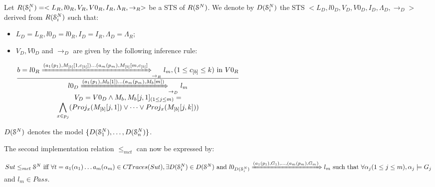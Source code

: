 
\begin{definition}
    Let
    $R(\EuScript{S}_i^{N})=<L_R,l0_R,V_R,V0_R,I_R,\Lambda_R,\rightarrow_R>$
    be a STS of $R(\EuScript{S}^{N})$. We denote by $D(\EuScript{S}_i^{N})$ the STS $ <L_D,l0_D,V_D,V0_D,I_D,\Lambda_D,\rightarrow_D>$ derived from $R(\EuScript{S}_i^{N})$ such that:
\begin{itemize}
    \item $L_D=L_{R}, l0_D=l0_{R}, I_D=I_{R},
        \Lambda_D=\Lambda_{R}$;
    \item $V_D, V0_D$ and $\rightarrow_D$ are given by the following inference rule:

				$\frac{
					\begin{matrix}
					b=l0_{R}
					\xRightarrow{(a_1(p_1),M_{[b]}[1,c_{[b]}])\dots (a_m(p_m),M_{[b]}[m,c_{[b]}]}_{\rightarrow_{R}}
					l_{m},
					(1 \leq c_{[b]} \leq k) \text{ in } V0_{R}
					\end{matrix}
				}
				{
					\begin{matrix}
					l0_D
					\xRightarrow{(a_1(p_1),M_b[1])\dots (a_m(p_m),M_b[m])}_{\rightarrow_D}
					l_m\\
					V_D=V0_D \wedge M_b, M_b[j, 1]_{(1\leq j \leq m)} =\\
					 \displaystyle \bigwedge_{x \in p_j} ( Proj_x(M_{[b]}[j, 1]) \vee \dots \vee Proj_x(M_{[b]}[j, k]))



					\end{matrix}
				}$
  \end{itemize}

    $D(\EuScript{S}^{N})$ denotes the model $\{D(\EuScript{S}_1^{N}),\dots,D(\EuScript{S}_n^{N}) \}$.
\end{definition}


The second implementation relation $\leq_{mct}$ can now be
expressed by:

\begin{proposition}
    ${Sut} \leq_{mct} \EuScript{S}^{N} \text{ iff }\forall t=
    a_1(\alpha_1) \dots a_m(\alpha_m) \in CTraces({Sut}), \exists
    D(\EuScript{S}_i^{N}) \in D(\EuScript{S}^{N}) \text{ and }
    l0_{D(\EuScript{S}_i^{N})}
    \xRightarrow{(a_1(p_1),G_{1}),\dots,(a_m(p_m),G_{m})} l_m
    \text{ such that } \forall \alpha_j (1 \leq j \leq m),
    \alpha_j \models G_{j}$ and $l_m \in Pass$.
\end{proposition}


